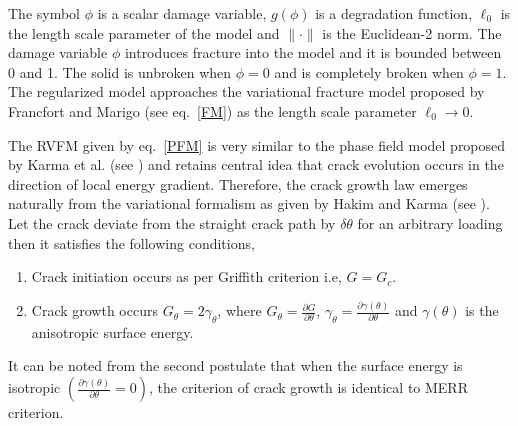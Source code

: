 \documentclass[11pt] {article}
\begin{document}
The symbol $\phi$ is a scalar damage variable, $g(\phi)$ is a degradation function, $\ell_0$ is the length scale parameter of the model and $\|\cdot\|$ is the Euclidean-2 norm. The damage variable $\phi$ introduces fracture into the model and it is bounded between 0 and 1. The solid is unbroken when $\phi = 0$ and is completely broken when $\phi = 1$. The regularized model approaches the variational fracture model proposed by Francfort and Marigo (see eq.~\eqref{FM}) as the length scale parameter $\ell_0 \to 0$.
\par
The RVFM given by eq.~\eqref{PFM} is very similar to the phase field model proposed by Karma et al. (see \cite{karma_2001}) and retains central idea that crack evolution occurs in the direction of local energy gradient. Therefore, the crack growth law emerges naturally from the variational formalism as given by Hakim and Karma (see \cite{hakim_2009}). Let the crack deviate from the straight crack path by $\delta \theta$ for an arbitrary loading then it satisfies the following conditions,
\begin{enumerate}[1)]
	\item Crack initiation occurs as per Griffith criterion i.e, $G=G_c$.
	\item Crack growth occurs $G_\theta = 2 \gamma_\theta$, where $G_\theta = \frac{\partial G}{\partial \theta}$, $\gamma_\theta = \frac{\partial \gamma (\theta)}{\partial \theta}$ and $\gamma(\theta)$ is the anisotropic surface energy.
\end{enumerate}
It can be noted from the second postulate that when the surface energy is isotropic $\left(\frac{\partial \gamma (\theta)}{\partial \theta} = 0\right)$, the criterion of crack growth is identical to MERR criterion.
\end{document}
